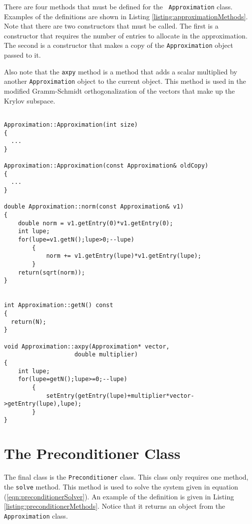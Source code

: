 There are four methods that must be defined for the {\tt
  Approximation} class. Examples of the definitions are shown in
Listing \ref{listing:approximationMethods}. Note that there are two
constructors that must be called. The first is a constructor that
requires the number of entries to allocate in the approximation. The
second is a constructor that makes a copy of the {\tt Approximation}
object passed to it.

Also note that the {\tt axpy} method is a method that adds a scalar
multiplied by another {\tt Approximation} object to the current
object. This method is used in the modified Gramm-Schmidt
orthogonalization of the vectors that make up the Krylov subspace.

\begin{lstlisting}[caption={An example of the methods that must be
    defined for the {\tt Approximation} class.},
                   basicstyle=\scriptsize,
                   label=listing:approximationMethods]

Approximation::Approximation(int size)
{
  ...
}

Approximation::Approximation(const Approximation& oldCopy)
{
  ...
}

double Approximation::norm(const Approximation& v1)
{
	double norm = v1.getEntry(0)*v1.getEntry(0);
	int lupe;
	for(lupe=v1.getN();lupe>0;--lupe)
		{
			norm += v1.getEntry(lupe)*v1.getEntry(lupe);
		}
	return(sqrt(norm));
}


int Approximation::getN() const
{
  return(N);
}

void Approximation::axpy(Approximation* vector,
					double multiplier)
{
	int lupe;
	for(lupe=getN();lupe>=0;--lupe)
		{
			setEntry(getEntry(lupe)+multiplier*vector->getEntry(lupe),lupe);
		}
}

\end{lstlisting}



\section{The Preconditioner Class}

The final class is the {\tt Preconditioner} class. This class only
requires one method, the {\tt solve} method. This method is used to
solve the system given in equation
(\ref{eqn:preconditionerSolver}). An example of the definition is
given in Listing \ref{listing:preconditionerMethods}. Notice that it
returns an object from the {\tt Approximation} class.


